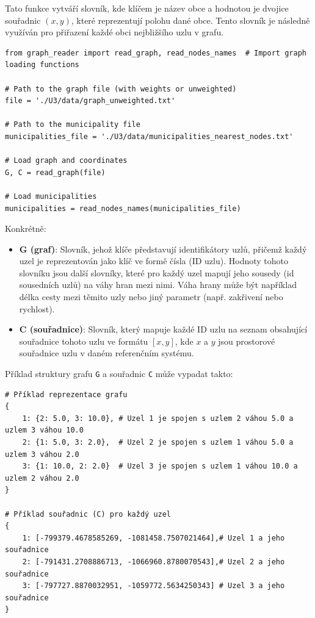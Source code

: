 Tato funkce vytváří slovník, kde klíčem je název obce a hodnotou je dvojice souřadnic \((x, y)\), které reprezentují polohu dané obce. Tento slovník je následně využíván pro přiřazení každé obci nejbližšího uzlu v grafu.

\begin{verbatim}
from graph_reader import read_graph, read_nodes_names  # Import graph loading functions

# Path to the graph file (with weights or unweighted)
file = './U3/data/graph_unweighted.txt'

# Path to the municipality file
municipalities_file = './U3/data/municipalities_nearest_nodes.txt'

# Load graph and coordinates
G, C = read_graph(file)

# Load municipalities
municipalities = read_nodes_names(municipalities_file)
\end{verbatim}

Konkrétně:

\begin{itemize}
    \item \textbf{G (graf)}: Slovník, jehož klíče představují identifikátory uzlů, přičemž každý uzel je reprezentován jako klíč ve formě čísla (ID uzlu). Hodnoty tohoto slovníku jsou další slovníky, které pro každý uzel mapují jeho sousedy (id sousedních uzlů) na váhy hran mezi nimi. Váha hrany může být například délka cesty mezi těmito uzly nebo jiný parametr (např. zakřivení nebo rychlost).
    \item \textbf{C (souřadnice)}: Slovník, který mapuje každé ID uzlu na seznam obsahující souřadnice tohoto uzlu ve formátu \([x, y]\), kde \(x\) a \(y\) jsou prostorové souřadnice uzlu v daném referenčním systému.
\end{itemize}

Příklad struktury grafu \texttt{G} a souřadnic \texttt{C} může vypadat takto:

\begin{verbatim}
# Příklad reprezentace grafu
{
    1: {2: 5.0, 3: 10.0}, # Uzel 1 je spojen s uzlem 2 váhou 5.0 a uzlem 3 váhou 10.0
    2: {1: 5.0, 3: 2.0},  # Uzel 2 je spojen s uzlem 1 váhou 5.0 a uzlem 3 váhou 2.0
    3: {1: 10.0, 2: 2.0}  # Uzel 3 je spojen s uzlem 1 váhou 10.0 a uzlem 2 váhou 2.0
}

# Příklad souřadnic (C) pro každý uzel
{
    1: [-799379.4678585269, -1081458.7507021464],# Uzel 1 a jeho souřadnice
    2: [-791431.2708886713, -1066960.8780070543],# Uzel 2 a jeho souřadnice
    3: [-797727.8870032951, -1059772.5634250343] # Uzel 3 a jeho souřadnice
}
\end{verbatim}

